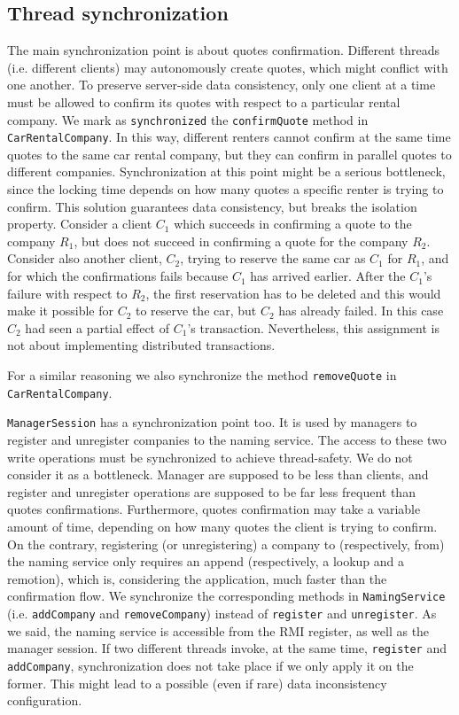 \subsection{Thread synchronization}
The main synchronization point is about quotes confirmation. Different threads (i.e. different clients) may autonomously create quotes, which might conflict with one another. To preserve server-side data consistency, only one client at a time must be allowed to confirm its quotes with respect to a particular rental company. We mark as \texttt{synchronized} the \texttt{confirmQuote} method in \texttt{CarRentalCompany}. In this way, different renters cannot confirm at the same time quotes to the same car rental company, but they can confirm in parallel quotes to different companies. Synchronization at this point might be a serious bottleneck, since the locking time depends on how many quotes a specific renter is trying to confirm. This solution guarantees data consistency, but breaks the isolation property. Consider a client $C_1$ which succeeds in confirming a quote to the company $R_1$, but does not succeed in confirming a quote for the company $R_2$. Consider also another client, $C_2$, trying to reserve the same car as $C_1$ for $R_1$, and for which the confirmations fails because $C_1$ has arrived earlier. After the $C_1$'s failure with respect to $R_2$, the first reservation has to be deleted and this would make it possible for $C_2$ to reserve the car, but $C_2$ has already failed. In this case $C_2$ had seen a partial effect of $C_1$'s transaction. Nevertheless, this assignment is not about implementing distributed transactions. 

For a similar reasoning we also synchronize the method \texttt{removeQuote} in \texttt{CarRentalCompany}.

\texttt{ManagerSession} has a synchronization point too. It is used by managers to register and unregister companies to the naming service. The access to these two write operations must be synchronized to achieve thread-safety. We do not consider it as a bottleneck. Manager are supposed to be less than clients, and register and unregister operations are supposed to be far less frequent than quotes confirmations. Furthermore, quotes confirmation may take a variable amount of time, depending on how many quotes the client is trying to confirm. On the contrary, registering (or unregistering) a company to (respectively, from) the naming service only requires an append (respectively, a lookup and a remotion), which is, considering the application, much faster than the confirmation flow. We synchronize the corresponding methods in \texttt{NamingService} (i.e. \texttt{addCompany} and \texttt{removeCompany}) instead of \texttt{register} and \texttt{unregister}. As we said, the naming service is accessible from the RMI register, as well as the manager session. If two different threads invoke, at the same time, \texttt{register} and \texttt{addCompany}, synchronization does not take place if we only apply it on the former. This might lead to a possible (even if rare) data inconsistency configuration. 

